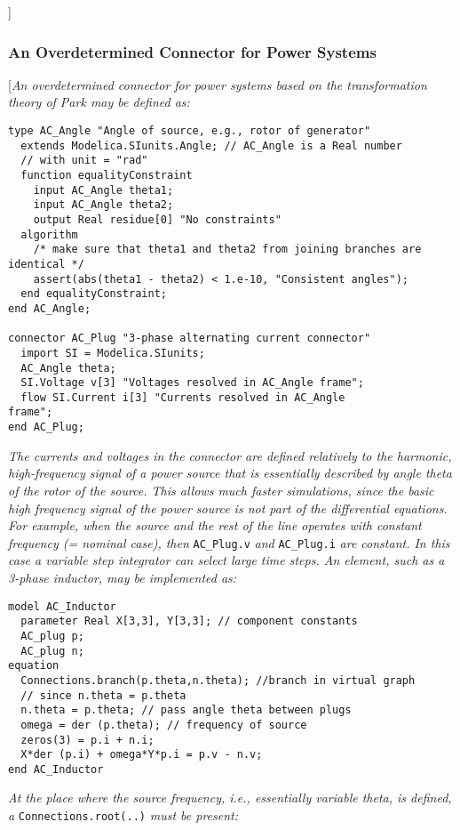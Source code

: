 {]}

\subsubsection{An Overdetermined Connector for Power Systems}

{[}\emph{An overdetermined connector for power systems based on the
transformation theory of Park may be defined as:}

\begin{lstlisting}[language=modelica]
type AC_Angle "Angle of source, e.g., rotor of generator"
  extends Modelica.SIunits.Angle; // AC_Angle is a Real number
  // with unit = "rad"
  function equalityConstraint
    input AC_Angle theta1;
    input AC_Angle theta2;
    output Real residue[0] "No constraints"
  algorithm
    /* make sure that theta1 and theta2 from joining branches are identical */
    assert(abs(theta1 - theta2) < 1.e-10, "Consistent angles");
  end equalityConstraint;
end AC_Angle;

connector AC_Plug "3-phase alternating current connector"
  import SI = Modelica.SIunits;
  AC_Angle theta;
  SI.Voltage v[3] "Voltages resolved in AC_Angle frame";
  flow SI.Current i[3] "Currents resolved in AC_Angle
frame";
end AC_Plug;
\end{lstlisting}
\emph{The currents and voltages in the connector are defined relatively
to the harmonic, high-frequency signal of a power source that is
essentially described by angle theta of the rotor of the source. This
allows much faster simulations, since the basic high frequency signal of
the power source is not part of the differential equations. For example,
when the source and the rest of the line operates with constant
frequency (= nominal case), then} \lstinline!AC_Plug.v! \emph{and} \lstinline!AC_Plug.i!
\emph{are constant. In this case a variable step integrator can select
large time steps. An element, such as a 3-phase inductor, may be
implemented as:}

\begin{lstlisting}[language=modelica]
model AC_Inductor
  parameter Real X[3,3], Y[3,3]; // component constants
  AC_plug p;
  AC_plug n;
equation
  Connections.branch(p.theta,n.theta); //branch in virtual graph
  // since n.theta = p.theta
  n.theta = p.theta; // pass angle theta between plugs
  omega = der (p.theta); // frequency of source
  zeros(3) = p.i + n.i;
  X*der (p.i) + omega*Y*p.i = p.v - n.v;
end AC_Inductor
\end{lstlisting}
\emph{At the place where the source frequency, i.e., essentially
variable theta, is defined, a} \lstinline!Connections.root(..)! \emph{must be
present:}


